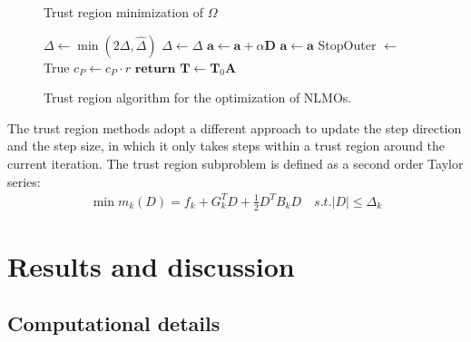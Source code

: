 \documentclass[aps,prl,reprint,amsmath,amssymb]{revtex4-1}
\begin{document}
\begin{figure}
\addtocounter{algorithm}{-1}
\begin{algorithm}[H]
\caption{Trust region minimization of $\Omega$}
   \begin{algorithmic}[1]
                       \State $\Delta \gets \min{(2\Delta, \hat{\Delta})}$
                     \Else
                        \State $\Delta \gets \Delta$ 
                     \EndIf
                 \EndIf
                 \If{$\rho > \eta$}
                    \State $\mathbf{a}\gets \mathbf{a} + \alpha \mathbf{D}$ 
                  \Else
                     \State $\mathbf{a}\gets  \mathbf{a}$ 
                 \EndIf
			\EndIf
			\State StopOuter $\gets$ True
		\EndIf
			\State $c_{P} \gets c_P \cdot r$ 
		\EndIf
	\State $\mathbf{return}$ $\mathbf{T} \gets \mathbf{T}_0 \mathbf{A} $ 
   \end{algorithmic}
\end{algorithm}
\caption{\label{fig:tr} Trust region algorithm for the optimization of NLMOs.}
\end{figure}
The trust region methods adopt a different approach to update the step direction and the step size, in which it only takes steps within a trust region around the current iteration. The trust region subproblem  is defined as a second order Taylor series:
%
\begin{equation} \label{eq:tr_subproblem}
\begin{split}
\min m_{k}(D) = f_{k} + G_{k}^T D + \frac{1}{2}D^T B_{k}D    \quad s.t. \lvert D \rvert \leq \Delta_{k}
\end{split}
\end{equation}
%




\section{Results and discussion}

\subsection{Computational details}
\end{document}
